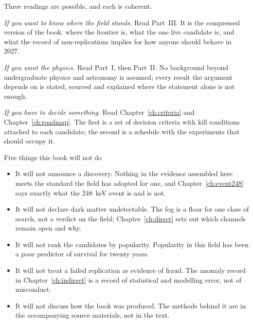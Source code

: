 Three readings are possible, and each is coherent.

\emph{If you want to know where the field stands.} Read Part~III. It is the
compressed version of the book: where the frontier is, what the one live
candidate is, and what the record of non-replications implies for how anyone
should behave in 2027.

\emph{If you want the physics.} Read Part~I, then Part~II. No background beyond
undergraduate physics and astronomy is assumed; every result the argument
depends on is stated, sourced and explained where the statement alone is not
enough.

\emph{If you have to decide something.} Read Chapter~\ref{ch:criteria} and
Chapter~\ref{ch:roadmap}. The first is a set of decision criteria with kill
conditions attached to each candidate; the second is a schedule with the
experiments that should occupy it.

\begin{mythbox}{Five things this book will not do}
\begin{itemize}
\item It will not announce a discovery. Nothing in the evidence assembled here
meets the standard the field has adopted for one, and Chapter~\ref{ch:event248}
says exactly what the 248~keV event is and is not.
\item It will not declare dark matter undetectable. The fog is a floor for one
class of search, not a verdict on the field; Chapter~\ref{ch:direct} sets out
which channels remain open and why.
\item It will not rank the candidates by popularity. Popularity in this field
has been a poor predictor of survival for twenty years.
\item It will not treat a failed replication as evidence of fraud. The anomaly
record in Chapter~\ref{ch:indirect} is a record of statistical and modelling
error, not of misconduct.
\item It will not discuss how the book was produced. The methods behind it are
in the accompanying source materials, not in the text.
\end{itemize}
\end{mythbox}

\vspace{8pt}

